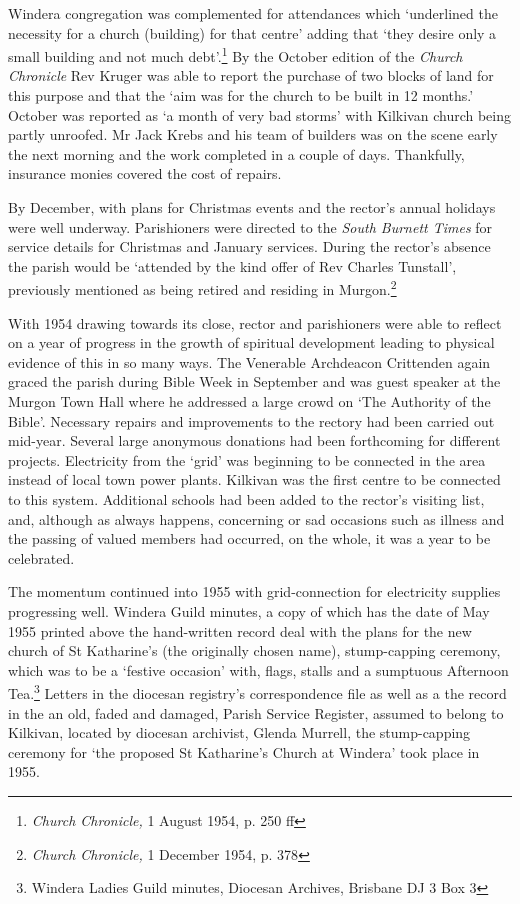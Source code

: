 Windera congregation was complemented for attendances which `underlined
the necessity for a church (building) for that centre' adding that `they
desire only a small building and not much debt'.\footnote{\emph{Church
  Chronicle,} 1 August 1954, p. 250 ff} By the October edition of the
\emph{Church Chronicle} Rev Kruger was able to report the purchase of
two blocks of land for this purpose and that the `aim was for the church
to be built in 12 months.' October was reported as `a month of very bad
storms' with Kilkivan church being partly unroofed. Mr Jack Krebs and
his team of builders was on the scene early the next morning and the
work completed in a couple of days. Thankfully, insurance monies covered
the cost of repairs.

By December, with plans for Christmas events and the rector's annual
holidays were well underway. Parishioners were directed to the
\emph{South Burnett Times} for service details for Christmas and January
services. During the rector's absence the parish would be `attended by
the kind offer of Rev Charles Tunstall', previously mentioned as being
retired and residing in Murgon.\footnote{\emph{Church Chronicle,} 1
  December 1954, p. 378}

With 1954 drawing towards its close, rector and parishioners were able
to reflect on a year of progress in the growth of spiritual development
leading to physical evidence of this in so many ways. The Venerable
Archdeacon Crittenden again graced the parish during Bible Week in
September and was guest speaker at the Murgon Town Hall where he
addressed a large crowd on `The Authority of the Bible'. Necessary
repairs and improvements to the rectory had been carried out mid-year.
Several large anonymous donations had been forthcoming for different
projects. Electricity from the `grid' was beginning to be connected in
the area instead of local town power plants. Kilkivan was the first
centre to be connected to this system. Additional schools had been added
to the rector's visiting list, and, although as always happens,
concerning or sad occasions such as illness and the passing of valued
members had occurred, on the whole, it was a year to be celebrated.

The momentum continued into 1955 with grid-connection for electricity
supplies progressing well. Windera Guild minutes, a copy of which has
the date of May 1955 printed above the hand-written record deal with the
plans for the new church of St Katharine's (the originally chosen name),
stump-capping ceremony, which was to be a `festive occasion' with,
flags, stalls and a sumptuous Afternoon Tea.\footnote{Windera Ladies
  Guild minutes, Diocesan Archives, Brisbane DJ 3 Box 3} Letters in the
diocesan registry's correspondence file as well as a the record in the
an old, faded and damaged, Parish Service Register, assumed to belong to
Kilkivan, located by diocesan archivist, Glenda Murrell, the
stump-capping ceremony for `the proposed St Katharine's Church at
Windera' took place in 1955.

